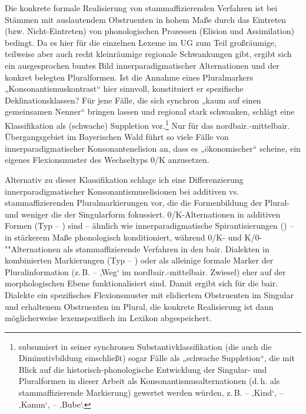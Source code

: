 \begin{itemize}
\end{itemize}

\begin{sloppypar}
Die konkrete formale Realisierung von stammaffizierenden Verfahren ist bei Stämmen mit auslautendem Obstruenten in hohem Maße durch das Eintreten (bzw. Nicht-Eintreten) von phonologischen Prozessen (Elision und Assimilation) bedingt. Da es hier für die einzelnen Lexeme im UG zum Teil großräumige, teilweise aber auch recht kleinräumige regionale Schwankungen gibt, ergibt sich ein ausgesprochen buntes Bild innerparadigmatischer Alternationen und der konkret belegten Pluralformen. Ist die Annahme eines Pluralmarkers „Konsonantismuskontrast“ hier sinnvoll, konstituiert er spezifische Deklinationsklassen? Für jene Fälle, die sich synchron „kaum auf einen gemeinsamen Nenner“ bringen lassen und regional stark schwanken, schlägt \citet[124]{Rowley1997} eine Klassifikation als (schwache) Suppletion vor.\footnote{\citet[217--218]{Schnabel2000} subsumiert in seiner synchronen Substantivklassifikation (die auch die Diminutivbildung einschließt) sogar Fälle als „schwache Suppletion“, die mit Blick auf die historisch-phonologische Entwicklung der Singular- und Pluralformen in dieser Arbeit als Konsonantismusalternationen (d.\,h. als stammaffizierende Markierung) gewertet werden würden, z.\,B.  --  ‚Kind‘,  --  ‚Kamm‘,  --  ‚Bube‘.} Nur für das nordbair.-mittelbair. Übergangsgebiet im Bayerischen Wald führt \citet[124]{Rowley1997} so viele Fälle von innerparadigmatischer Konsonantenelision an, dass es „ökonomischer“ scheine, ein eigenes Flexionsmuster des Wechseltyps 0/K anzusetzen.
\end{sloppypar}

Alternativ zu dieser Klassifikation schlage ich eine Differenzierung innerparadigmatischer Konsonantismuselisionen bei additiven vs. stammaffizierenden Pluralmarkierungen vor, die die Formenbildung der Plural- und weniger die der Singularform fokussiert. 0/K-Alternationen in additiven Formen (Typ  -- ) sind -- ähnlich wie innerparadigmatische Spirantisierungen () -- in stärkerem Maße phonologisch konditioniert, während 0/K- und K/0-""Al\-ter\-na\-tio\-nen als stammaffizierende Verfahren in den bair. Dialekten in kombinierten Markierungen (Typ  -- ) oder als alleinige formale Marker der Pluralinformation (z.\,B.  --  ‚Weg‘ im nordbair.-mittelbair. Zwiesel) eher auf der morphologischen Ebene funktionalisiert sind. Damit ergibt sich für die bair. Dialekte ein spezifisches Flexionsmuster mit elidiertem Obstruenten im Singular und erhaltenem Obstruenten im Plural, die konkrete Realisierung ist dann möglicherweise lexemspezifisch im Lexikon abgespeichert.

